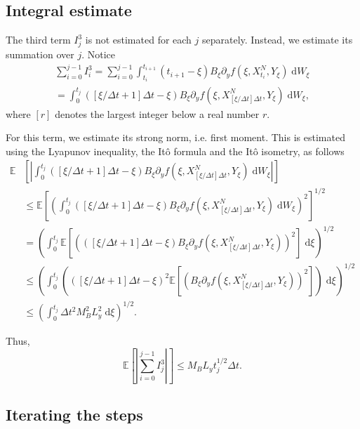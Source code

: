 \documentclass[reqno,12pt]{amsart}
\theoremstyle{plain}%
\theoremstyle{definition}
\begin{document}
\subsection{Integral estimate}

The third term $I_j^3$ is not estimated for each $j$ separately. Instead, we estimate its summation over $j$. Notice
\begin{multline*}
\sum_{i=0}^{j-1} I_i^3 = \sum_{i=0}^{j-1} \int_{t_i}^{t_{i+1}} (t_{i+1} - \xi) B_\xi \partial_y f(\xi, X_{t_i}^N, Y_\xi)  \;\mathrm{d}W_\xi \\
 = \int_0^{t_j} \left([\xi/\Delta t + 1]\Delta t - \xi\right) B_\xi \partial_y f(\xi, X_{[\xi/\Delta t]\Delta t}^N, Y_\xi) \;\mathrm{d}W_\xi,
\end{multline*}
where $[r]$ denotes the largest integer below a real number $r$.

For this term, we estimate its strong norm, i.e. first moment. This is estimated using the Lyapunov inequality, the It\^o formula and the It\^o isometry, as follows
\begin{align*}
  \mathbb{E}&\left[ \left| \int_0^{t_j} \left([\xi/\Delta t + 1]\Delta t - \xi\right) B_\xi \partial_y f(\xi, X_{[\xi/\Delta t]\Delta t}^N, Y_\xi) \;\mathrm{d}W_\xi\right| \right] \\
   & \leq \mathbb{E}\left[ \left( \int_0^{t_j} \left([\xi/\Delta t + 1]\Delta t - \xi\right) B_\xi \partial_y f(\xi, X_{[\xi/\Delta t]\Delta t}^N, Y_\xi)\;\mathrm{d}W_\xi \right)^2 \right]^{1/2} \\
   & =  \left(\int_0^{t_j} \mathbb{E}\left[ \left(\left([\xi/\Delta t + 1]\Delta t - \xi\right) B_\xi \partial_y f(\xi, X_{[\xi/\Delta t]\Delta t}^N, Y_\xi)\right)^2 \right]\;\mathrm{d}\xi \right)^{1/2}\\
   & \leq \left(\int_0^{t_j} \left(\left([\xi/\Delta t + 1]\Delta t - \xi\right)^2\mathbb{E}\left[ \left( B_\xi \partial_y f(\xi, X_{[\xi/\Delta t]\Delta t}^N, Y_\xi)\right)^2 \right]\right) \;\mathrm{d}\xi \right)^{1/2}\\
   & \leq \left(\int_0^{t_j} \Delta t^2 M_B^2 L_y^2 \;\mathrm{d}\xi \right)^{1/2}.
\end{align*}

Thus,
\begin{equation}
  \label{I3estimate}
  \mathbb{E}\left[ \left| \sum_{i=0}^{j-1} I_j^3 \right| \right] \leq M_B L_y t_j^{1/2} \Delta t.
\end{equation}

\subsection{Iterating the steps}
\end{document}
